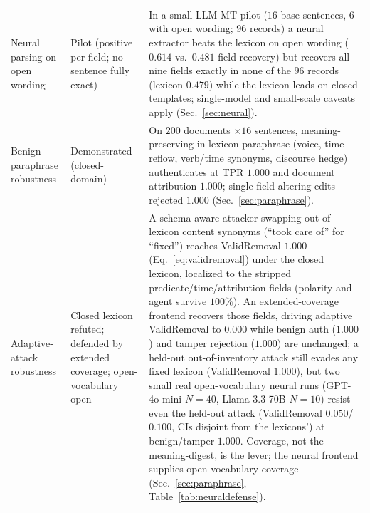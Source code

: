 \documentclass[journal]{IEEEtran}
\begin{document}
\begin{table}[t]
\begin{tabularx}{\textwidth}{@{}>{\raggedright\arraybackslash}p{3.1cm}>{\raggedright\arraybackslash}p{3.0cm}X@{}}
Neural parsing on open wording & Pilot (positive per field; no sentence fully exact) & In a small LLM-MT pilot ($16$ base sentences, $6$ with open wording; $96$ records) a neural extractor beats the lexicon on open wording ($0.614$ vs.\ $0.481$ field recovery) but recovers all nine fields exactly in none of the $96$ records (lexicon $0.479$) while the lexicon leads on closed templates; single-model and small-scale caveats apply (Sec.~\ref{sec:neural}). \\
Benign paraphrase robustness & Demonstrated (closed-domain) & On $200$ documents $\times16$ sentences, meaning-preserving in-lexicon paraphrase (voice, time reflow, verb/time synonyms, discourse hedge) authenticates at TPR $1.000$ and document attribution $1.000$; single-field altering edits rejected $1.000$ (Sec.~\ref{sec:paraphrase}). \\
Adaptive-attack robustness & Closed lexicon refuted; defended by extended coverage; open-vocabulary open & A schema-aware attacker swapping out-of-lexicon content synonyms (``took care of'' for ``fixed'') reaches ValidRemoval $1.000$ (Eq.~\ref{eq:validremoval}) under the closed lexicon, localized to the stripped predicate/time/attribution fields (polarity and agent survive $100\%$). An extended-coverage frontend recovers those fields, driving adaptive ValidRemoval to $0.000$ while benign auth ($1.000$) and tamper rejection ($1.000$) are unchanged; a held-out out-of-inventory attack still evades any fixed lexicon (ValidRemoval $1.000$), but two small real open-vocabulary neural runs (GPT-4o-mini $N{=}40$, Llama-3.3-70B $N{=}10$) resist even the held-out attack (ValidRemoval $0.050$/$0.100$, CIs disjoint from the lexicons') at benign/tamper $1.000$. Coverage, not the meaning-digest, is the lever; the neural frontend supplies open-vocabulary coverage (Sec.~\ref{sec:paraphrase}, Table~\ref{tab:neuraldefense}). \\
\bottomrule
\end{tabularx}
\end{table}
\end{document}
